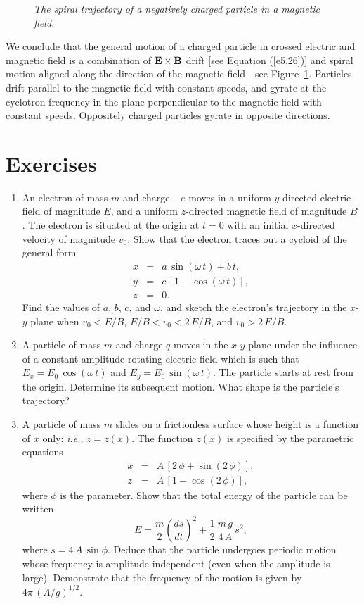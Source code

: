 \begin{figure}[h]
\epsfysize=1in
\centerline{}
\caption{\em The spiral trajectory of a negatively charged particle in a magnetic field.}\label{f5.3}
\end{figure}

We conclude that the general motion of a charged particle in crossed
electric and magnetic field is a combination of ${\bf E}\times{\bf B}$
drift [see Equation (\ref{e5.26})] and spiral motion aligned along the
direction of the magnetic field---see Figure~\ref{f5.3}. Particles drift parallel to the magnetic field
with constant speeds, and gyrate at the cyclotron frequency in the plane perpendicular to the magnetic field with constant speeds.
Oppositely charged particles gyrate in opposite directions.

\section{Exercises}
{\small
\renewcommand{\theenumi}{4.\arabic{enumi}}
\begin{enumerate}
\item An electron of mass $m$ and charge $-e$ moves in a uniform $y$-directed electric field of magnitude $E$,
and a uniform $z$-directed magnetic field of magnitude $B$. The electron is situated at the
origin at $t=0$ with an initial $x$-directed velocity of magnitude $v_0$. Show that the
electron traces out a cycloid of the general form
\begin{eqnarray}
x &=& a\,\sin(\omega\,t) + b\,t,\nonumber\\[0.5ex]
y &=& c\,[1-\cos(\omega\,t)],\nonumber\\[0.5ex]
z &=& 0.\nonumber
\end{eqnarray}
Find the values of $a$, $b$, $c$, and $\omega$, and sketch the electron's trajectory
in the $x$-$y$ plane when $v_0<E/B$, $E/B < v_0 < 2\,E/B$, and
$v_0> 2\,E/B$.

\item A particle of mass $m$ and charge $q$ moves in the $x$-$y$ plane
under the influence of a constant amplitude rotating electric field
which is such that $E_x= E_0\,\cos(\omega\,t)$ and $E_y=E_0\,\sin(\omega\,t)$. The particle starts at rest from the origin. Determine its subsequent motion. What shape is the particle's trajectory?
\item A particle of mass $m$ slides on a frictionless surface whose height is a
function of $x$ only: {\em i.e.}, $z=z(x)$. The function $z(x)$
is specified by the parametric equations
\begin{eqnarray}
x&= &A\,[2\,\phi + \sin (2\,\phi)],\nonumber\\[0.5ex]
z& = &A\,[1-\cos (2\,\phi)],\nonumber
\end{eqnarray}
where $\phi$ is the parameter. Show that the total energy of the
particle can be written
$$
E = \frac{m}{2}\left(\frac{ds}{dt}\right)^{2} + \frac{1}{2}\,\frac{m\,g}{4\,A}\,s^2,
$$
where $s=4\,A\,\sin\phi$. Deduce that the particle undergoes periodic
motion whose frequency is amplitude independent (even when the amplitude
is large). Demonstrate that the frequency of the motion is given by $4\pi\,(A/g)^{1/2}$. 
\end{enumerate}
}